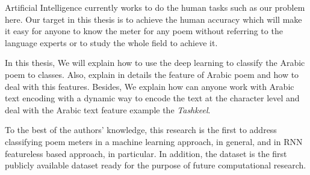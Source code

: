 Artificial Intelligence currently works to do the human tasks such as our problem here. Our target in this thesis is to achieve the human accuracy which will make it easy for anyone to know the meter for any poem without referring to the language experts or to study the whole field to achieve it.

In this thesis, We will explain how to use the deep learning to classify the Arabic poem to classes. Also, explain in details the feature of Arabic poem and how to deal with this features. Besides, We explain how can anyone work with Arabic text encoding with a dynamic way to encode the text at the character level and deal with the Arabic text feature example the  \textit{Tashkeel}.

To the best of the authors’ knowledge, this research is the first to address classifying poem meters in a machine learning approach, in general, and in RNN featureless based approach, in particular. In addition, the dataset is the first publicly available dataset ready for the purpose of future computational research.




